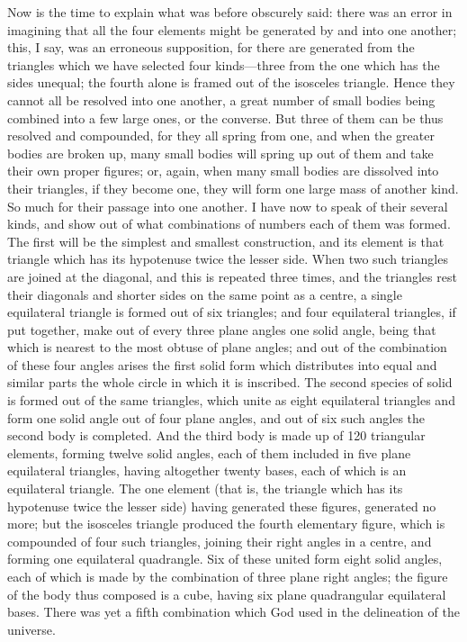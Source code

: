 \documentclass[11pt,letter]{article}
\begin{document}
\par  Now is the time to explain what was before obscurely said: there was an error in imagining that all the four elements might be generated by and into one another; this, I say, was an erroneous supposition, for there are generated from the triangles which we have selected four kinds—three from the one which has the sides unequal; the fourth alone is framed out of the isosceles triangle. Hence they cannot all be resolved into one another, a great number of small bodies being combined into a few large ones, or the converse. But three of them can be thus resolved and compounded, for they all spring from one, and when the greater bodies are broken up, many small bodies will spring up out of them and take their own proper figures; or, again, when many small bodies are dissolved into their triangles, if they become one, they will form one large mass of another kind. So much for their passage into one another. I have now to speak of their several kinds, and show out of what combinations of numbers each of them was formed. The first will be the simplest and smallest construction, and its element is that triangle which has its hypotenuse twice the lesser side. When two such triangles are joined at the diagonal, and this is repeated three times, and the triangles rest their diagonals and shorter sides on the same point as a centre, a single equilateral triangle is formed out of six triangles; and four equilateral triangles, if put together, make out of every three plane angles one solid angle, being that which is nearest to the most obtuse of plane angles; and out of the combination of these four angles arises the first solid form which distributes into equal and similar parts the whole circle in which it is inscribed. The second species of solid is formed out of the same triangles, which unite as eight equilateral triangles and form one solid angle out of four plane angles, and out of six such angles the second body is completed. And the third body is made up of 120 triangular elements, forming twelve solid angles, each of them included in five plane equilateral triangles, having altogether twenty bases, each of which is an equilateral triangle. The one element (that is, the triangle which has its hypotenuse twice the lesser side) having generated these figures, generated no more; but the isosceles triangle produced the fourth elementary figure, which is compounded of four such triangles, joining their right angles in a centre, and forming one equilateral quadrangle. Six of these united form eight solid angles, each of which is made by the combination of three plane right angles; the figure of the body thus composed is a cube, having six plane quadrangular equilateral bases. There was yet a fifth combination which God used in the delineation of the universe.
\end{document}
